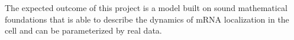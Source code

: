 \documentclass[12pt]{article}
\begin{document}
The expected outcome of this project is a model built on sound mathematical foundations that is able to describe the dynamics of mRNA localization in the cell and can be parameterized by real data.

 

\end{document}
